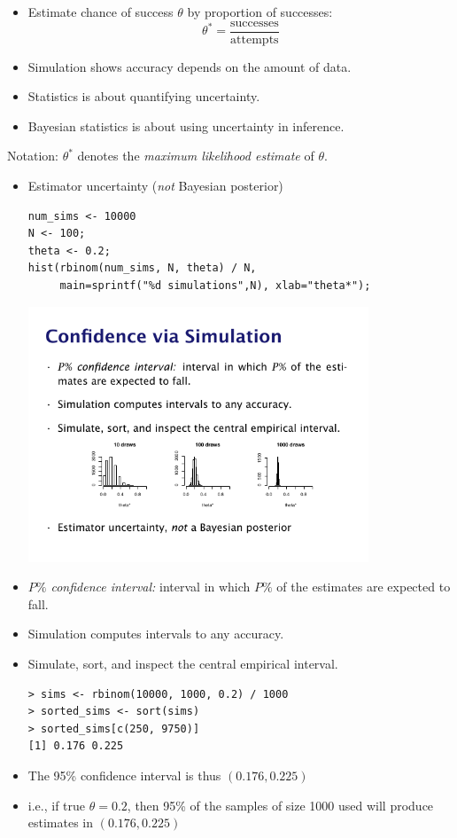 \documentclass[10pt]{report}
\begin{document}
%
\begin{itemize}
\item Estimate chance of success $\theta$ by proportion of successes:
\[
\theta^{*} = \frac{\text{successes}}{\text{attempts}}
\]
\item Simulation shows accuracy depends on the amount of data.
\item Statistics is about quantifying uncertainty.
\item Bayesian statistics is about using uncertainty in inference.
\end{itemize}

{\footnotesize Notation: $\theta^{*}$ denotes the
{\it maximum likelihood estimate} of $\theta$.}


%
\begin{itemize}
\item Estimator uncertainty (\emph{not} Bayesian posterior)
{\small
\begin{Verbatim}
num_sims <- 10000
N <- 100;
theta <- 0.2;
hist(rbinom(num_sims, N, theta) / N,
     main=sprintf("%d simulations",N), xlab="theta*");
\end{Verbatim}
}
\vspace*{-12pt}
\begin{center}
\includegraphics[width=0.8\textwidth]{img/hist-10-100-1000.pdf}
\end{center}
\end{itemize}


%
\begin{itemize}
\item \emph{$P\%$ confidence interval:}  interval in which $P\%$ of the estimates are
expected to fall.
\item Simulation computes intervals to any accuracy.
\item Simulate, sort, and inspect the central empirical interval.
{\small
\begin{Verbatim}
> sims <- rbinom(10000, 1000, 0.2) / 1000
> sorted_sims <- sort(sims)
> sorted_sims[c(250, 9750)]
[1] 0.176 0.225
\end{Verbatim}
}
\item The 95\% confidence interval is thus $(0.176,0.225)$
\item i.e., if true $\theta = 0.2$, then 95\% of the samples of
  size 1000 used will produce estimates in $(0.176,0.225)$
\end{itemize}
\end{document}
